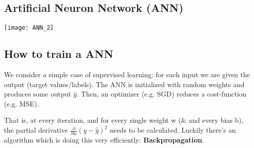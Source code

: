 \subsection{Artificial Neuron Network (ANN)}
\texttt{[image: ANN\_2]}

\subsection{How to train a ANN}
 We consider a simple case of supervised learning: for each input we are given the output (target values/labels). The ANN is initialized with random weights and produces some output  $\hat{y}$. Then, an optimizer (e.g. SGD) reduces a cost-function (e.g. MSE).
 
  That is, at every iteration, and for every single weight w (\& and every bias b), the partial derivative $\frac{\partial }{\partial w} (y-\hat{y})^2$ needs to be calculated. Luckily there's an algorithm which is doing this very efficiently: \textbf{Backpropagation}.



